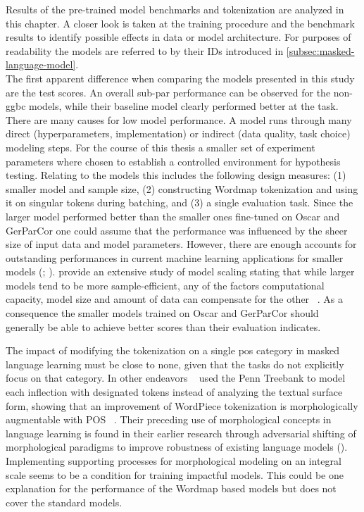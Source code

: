 Results of the pre-trained model benchmarks and tokenization are analyzed in this chapter.
A closer look is taken at the training procedure and the benchmark results to identify possible effects in data or model architecture.
For purposes of readability the models are referred to by their IDs introduced in \autoref{subsec:masked-language-model}.\\

The first apparent difference when comparing the models presented in this study are the test scores.
An overall sub-par performance can be observed for the non-ggbc models, while their baseline model clearly performed better at the task.
There are many causes for low model performance.
A model runs through many direct (hyperparameters, implementation) or indirect (data quality, task choice) modeling steps.
For the course of this thesis a smaller set of experiment parameters where chosen to establish a controlled environment for hypothesis testing.
Relating to the models this includes the following design measures: (1) smaller model and sample size, (2) constructing Wordmap tokenization and using it on singular tokens during batching, and (3) a single evaluation task.
Since the larger model performed better than the smaller ones fine-tuned on Oscar and GerParCor one could assume that the performance was influenced by the sheer size of input data and model parameters.
However, there are enough accounts for outstanding performances in current machine learning applications for smaller models (\textcite{smallmodelbigbang}; \textcite{fewshotTHREEpercent}).
\citeauthor{scalinglaws} provide an extensive study of model scaling stating that while larger models tend to be more sample-efficient, any of the factors computational capacity, model size and amount of data can compensate for the other ~\citeyear[3]{scalinglaws}.
As a consequence the smaller models trained on Oscar and GerParCor should generally be able to achieve better scores than their evaluation indicates.

The impact of modifying the tokenization on a single \ac{pos} category in masked language learning must be close to none, given that the tasks do not explicitly focus on that category.
In other endeavors ~\citeauthor{BITE} used the Penn Treebank to model each inflection with designated tokens instead of analyzing the textual surface form, showing that an improvement of WordPiece tokenization is morphologically augmentable with \ac{POS} ~\citeyear{BITE}.
Their preceding use of morphological concepts in language learning is found in their earlier research through adversarial shifting of morphological paradigms to improve robustness of existing language models (\cite[2927]{adversarialmorphin}).
Implementing supporting processes for morphological modeling on an integral scale seems to be a condition for training impactful models.
This could be one explanation for the performance of the Wordmap based models but does not cover the standard models.

